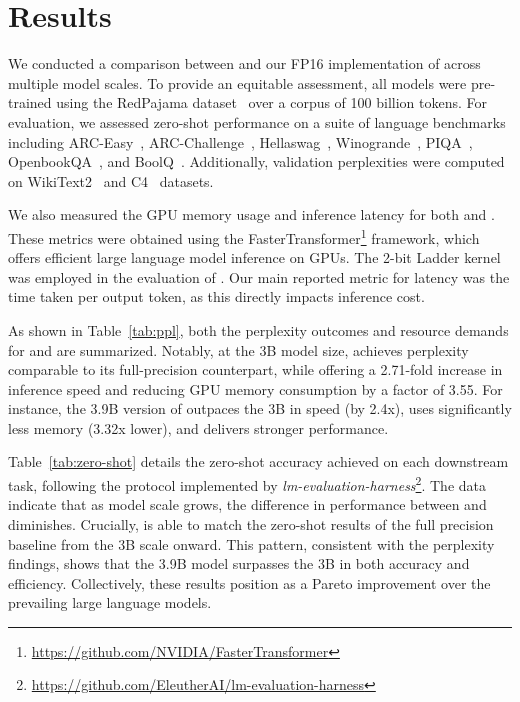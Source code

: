 \section{Results}

We conducted a comparison between  and our FP16 implementation of  across multiple model scales. To provide an equitable assessment, all models were pre-trained using the RedPajama dataset~\cite{redpajama} over a corpus of 100 billion tokens. For evaluation, we assessed zero-shot performance on a suite of language benchmarks including ARC-Easy~\cite{arc}, ARC-Challenge~\cite{arc}, Hellaswag~\cite{hellaswag}, Winogrande~\cite{winoGrande}, PIQA~\cite{piqa}, OpenbookQA~\cite{openbookqa}, and BoolQ~\cite{boolq}. Additionally, validation perplexities were computed on WikiText2~\cite{wikitext2} and C4~\cite{c4} datasets.

We also measured the GPU memory usage and inference latency for both  and . These metrics were obtained using the FasterTransformer\footnote{\url{https://github.com/NVIDIA/FasterTransformer}} framework, which offers efficient large language model inference on GPUs. The 2-bit Ladder kernel~\cite{ladder} was employed in the evaluation of . Our main reported metric for latency was the time taken per output token, as this directly impacts inference cost.

As shown in Table~\ref{tab:ppl}, both the perplexity outcomes and resource demands for  and  are summarized. Notably, at the 3B model size,  achieves perplexity comparable to its full-precision counterpart, while offering a 2.71-fold increase in inference speed and reducing GPU memory consumption by a factor of 3.55. For instance, the 3.9B version of  outpaces the  3B in speed (by 2.4x), uses significantly less memory (3.32x lower), and delivers stronger performance.

Table~\ref{tab:zero-shot} details the zero-shot accuracy achieved on each downstream task, following the protocol implemented by \emph{lm-evaluation-harness}\footnote{\url{https://github.com/EleutherAI/lm-evaluation-harness}}. The data indicate that as model scale grows, the difference in performance between  and  diminishes. Crucially,  is able to match the zero-shot results of the full precision baseline from the 3B scale onward. This pattern, consistent with the perplexity findings, shows that the 3.9B  model surpasses the 3B  in both accuracy and efficiency. Collectively, these results position  as a Pareto improvement over the prevailing large language models.

